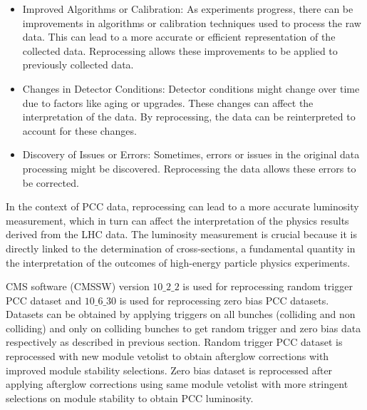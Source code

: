 \begin{itemize}
  
\item Improved Algorithms or Calibration: As experiments progress, there can be improvements in algorithms or calibration techniques used to process the raw data. This can lead to a more accurate or efficient representation of the collected data. Reprocessing allows these improvements to be applied to previously collected data.

\item Changes in Detector Conditions: Detector conditions might change over time due to factors like aging or upgrades. These changes can affect the interpretation of the data. By reprocessing, the data can be reinterpreted to account for these changes.

\item Discovery of Issues or Errors: Sometimes, errors or issues in the original data processing might be discovered. Reprocessing the data allows these errors to be corrected.

\end{itemize}
  
In the context of PCC data, reprocessing can lead to a more accurate luminosity measurement, which in turn can affect the interpretation of the physics results derived from the LHC data. The luminosity measurement is crucial because it is directly linked to the determination of cross-sections, a fundamental quantity in the interpretation of the outcomes of high-energy particle physics experiments.

CMS software (CMSSW) version $10{\_}2{\_}2$ is used for reprocessing random trigger PCC dataset and $10{\_}6{\_}30$  \cite{CMSReleaseNotes} is used for reprocessing zero bias PCC datasets. Datasets can be obtained by applying triggers on all bunches (colliding and non colliding) and only on colliding bunches to get random trigger and zero bias data respectively as described in previous section. Random trigger PCC dataset is reprocessed with new module vetolist to obtain afterglow corrections with improved module stability selections. Zero bias dataset is reprocessed after applying afterglow corrections using same module vetolist with more stringent selections on module stability to obtain PCC luminosity. 



